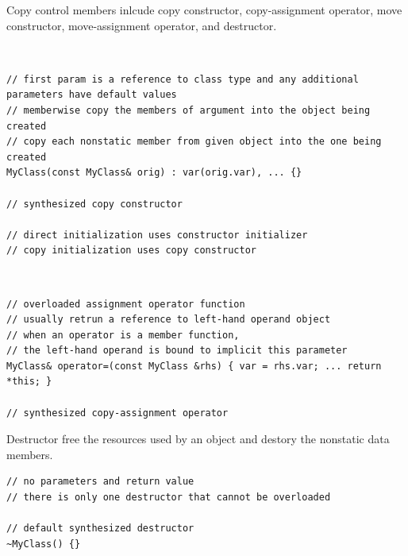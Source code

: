 \documentclass{blog}
\begin{document}
\begin{definition}
    Copy control members inlcude copy constructor, copy-assignment operator,
    move constructor, move-assignment operator, and destructor.
\end{definition}

\begin{definition}~
    \begin{verbatim}
// first param is a reference to class type and any additional parameters have default values
// memberwise copy the members of argument into the object being created
// copy each nonstatic member from given object into the one being created
MyClass(const MyClass& orig) : var(orig.var), ... {}

// synthesized copy constructor

// direct initialization uses constructor initializer
// copy initialization uses copy constructor
\end{verbatim}
\end{definition}

\begin{definition}~
    \begin{verbatim}
// overloaded assignment operator function
// usually retrun a reference to left-hand operand object
// when an operator is a member function,
// the left-hand operand is bound to implicit this parameter
MyClass& operator=(const MyClass &rhs) { var = rhs.var; ... return *this; }

// synthesized copy-assignment operator
\end{verbatim}
\end{definition}

\begin{definition}[destructor]
    Destructor free the resources used by an object and destory the nonstatic data members.
    \begin{verbatim}
// no parameters and return value
// there is only one destructor that cannot be overloaded

// default synthesized destructor
~MyClass() {}
\end{verbatim}
\end{definition}

\begin{definition}~
    \begin{verbatim}
\end{verbatim}
\end{definition}
\end{document}
